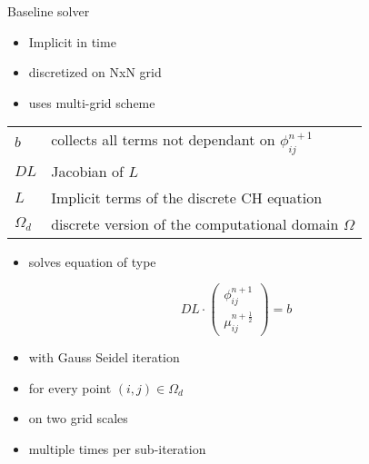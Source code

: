 \documentclass[presentation]{beamer}
\begin{document}
\begin{frame}[label={sec:orgb21f9df}]{Baseline solver}
\begin{itemize}
\item Implicit in time
\item discretized on NxN grid
\item uses multi-grid scheme
\end{itemize}
\begin{center}
\begin{tabular}{ll}
\(b\) & collects all terms not dependant on \(\phi_{ij}^{n+1}\)\\
\(DL\) & Jacobian of \(L\)\\
\(L\) & Implicit terms of the discrete CH equation\\
\(\Omega_d\) & discrete version of the computational domain \(\Omega\)\\
\end{tabular}
\end{center}
\begin{itemize}
\item solves equation of type
\end{itemize}
\begin{equation}
DL \cdot
\begin{pmatrix}
\phi^{n+1}_{ij} \\
\mu^{n+\frac{1}{2}}_{ij}
\end{pmatrix}
= b
\end{equation}
\begin{itemize}
\item with Gauss Seidel iteration
\item for every point \((i,j) \in \Omega_d\)
\item on two grid scales
\item multiple times per sub-iteration
\end{itemize}
\end{frame}
\end{document}
